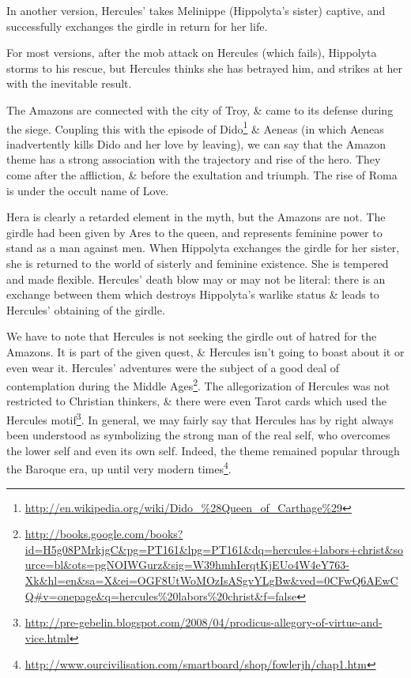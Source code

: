 In another version, Hercules' takes Melinippe (Hippolyta's sister) captive, and successfully exchanges the girdle in return for her life.

For most versions, after the mob attack on Hercules (which fails), Hippolyta storms to his rescue, but Hercules thinks she has betrayed him, and strikes at her with the inevitable result.

The Amazons are connected with the city of Troy, \& came to its defense during the siege. Coupling this with the episode of Dido\footnote{\url{http://en.wikipedia.org/wiki/Dido\_\%28Queen\_of\_Carthage\%29}} \&{} Aeneas (in which Aeneas inadvertently kills Dido and her love by leaving), we can say that the Amazon theme has a strong association with the trajectory and rise of the hero. They come after the affliction, \& before the exultation and triumph. The rise of Roma is under the occult name of Love.

Hera is clearly a retarded element in the myth, but the Amazons are not. The girdle had been given by Ares to the queen, and represents feminine power to stand as a man against men. When Hippolyta exchanges the girdle for her sister, she is returned to the world of sisterly and feminine existence. She is tempered and made flexible. Hercules' death blow may or may not be literal: there is an exchange between them which destroys Hippolyta's warlike status \& leads to Hercules' obtaining of the girdle.

We have to note that Hercules is not seeking the girdle out of hatred for the Amazons. It is part of the given quest, \& Hercules isn't going to boast about it or even wear it. Hercules' adventures were the subject of a good deal of contemplation during the Middle Ages\footnote{\url{http://books.google.com/books?id=H5g08PMrkjgC&pg=PT161&lpg=PT161&dq=hercules+labors+christ&source=bl&ots=pgNOIWGurz&sig=W39hmhIerqtKjEUo4W4eY763-Xk&hl=en&sa=X&ei=OGF8UtWoMOzIsASgvYLgBw&ved=0CFwQ6AEwCQ\#v=onepage&q=hercules\%20labors\%20christ&f=false}}. The allegorization of Hercules was not restricted to Christian thinkers, \& there were even Tarot cards which used the Hercules motif\footnote{\url{http://pre-gebelin.blogspot.com/2008/04/prodicus-allegory-of-virtue-and-vice.html}}. In general, we may fairly say that Hercules has by right always been understood as symbolizing the strong man of the real self, who overcomes the lower self and even its own self. Indeed, the theme remained popular through the Baroque era, up until very modern times\footnote{\url{http://www.ourcivilisation.com/smartboard/shop/fowlerjh/chap1.htm}}.

